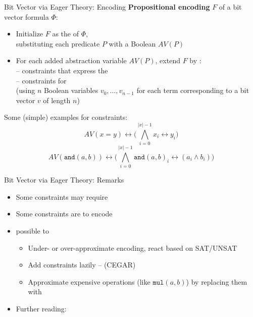 \documentclass[t,english]{sdqbeamer}
\begin{document}
\begin{frame}{Bit Vector via Eager Theory: Encoding}
	\textbf{Propositional encoding} $F$ of a bit vector formula $\Phi$:
	\begin{itemize}
		\item Initialize $F$ as the  of $\Phi$,\\
		substituting each predicate $P$ with a Boolean  $AV(P)$
		\item For each added abstraction variable $AV(P)$, extend $F$ by : \\
		-- {constraints} that express the \\
		-- constraints for \\
		(using $n$ Boolean variables $v_0,\ldots,v_{n-1}$ for each term corresponding to a bit vector $v$ of length $n$)
	\end{itemize}
	
	\vspace*{2mm}
	Some (simple) examples for constraints:
	\[ AV(x = y) \leftrightarrow \big(\bigwedge_{i=0}^{|x|-1} x_i \leftrightarrow y_i\big) \]
	\[ AV(\texttt{and}(a, b)) \leftrightarrow \big( \bigwedge_{i=0}^{|x|-1} \texttt{and}(a, b)_i \leftrightarrow (a_i \wedge b_i) \big) \]
\end{frame}

\begin{frame}{Bit Vector via Eager Theory: Remarks}
	\begin{itemize}
		\item Some constraints may require 
		\item Some constraints are  to encode
		\item {} possible to 
		\begin{itemize}
			\item Under- or over-approximate encoding, react based on SAT/UNSAT
			\item Add constraints lazily --  (CEGAR)
			\item Approximate expensive operations (like $\texttt{mul}(a, b)$) by replacing them with 
		\end{itemize}
		\item Further reading: \cite{teuber2020incremental}
	\end{itemize}
\end{frame}
\end{document}
